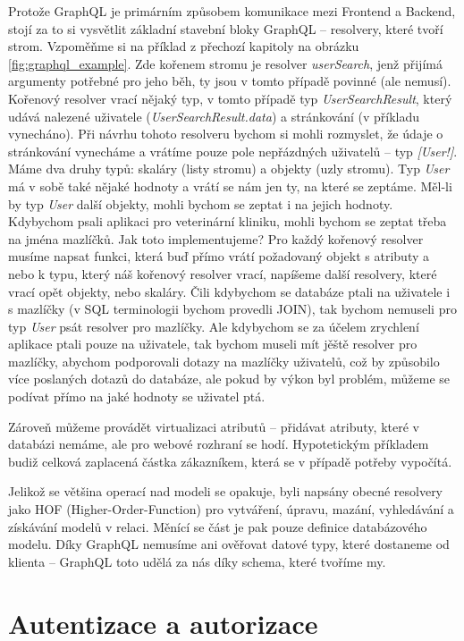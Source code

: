 Protože GraphQL je primárním způsobem komunikace mezi Frontend a Backend, stojí za to si vysvětlit základní stavební bloky
GraphQL -- resolvery, které tvoří strom. Vzpoměňme si na příklad z přechozí kapitoly na obrázku \ref{fig:graphql_example}.
Zde kořenem stromu je resolver \textit{userSearch}, jenž přijímá argumenty potřebné pro jeho běh, ty jsou v tomto případě
povinné (ale nemusí). Kořenový resolver vrací nějaký typ, v tomto případě typ \textit{UserSearchResult}, který udává nalezené
uživatele (\textit{UserSearchResult.data}) a stránkování (v příkladu vynecháno).
Při návrhu tohoto resolveru bychom si mohli rozmyslet, že údaje o stránkování vynecháme a vrátíme pouze
pole nepřázdných uživatelů -- typ \textit{[User!]}.
Máme dva druhy typů: skaláry (listy stromu) a objekty (uzly stromu).
Typ \textit{User} má v sobě také nějaké hodnoty a vrátí se nám jen ty, na které se zeptáme. Měl-li by typ \textit{User}
další objekty, mohli bychom se zeptat i na jejich hodnoty. Kdybychom psali aplikaci pro veterinární kliniku, mohli bychom se zeptat
třeba na jména mazlíčků.
Jak toto implementujeme? Pro každý kořenový resolver musíme napsat funkci, která buď přímo vrátí požadovaný objekt s atributy a nebo
k typu, který náš kořenový resolver vrací, napíšeme další resolvery, které vrací opět objekty, nebo skaláry.
Čili kdybychom se databáze ptali na uživatele i s
mazlíčky (v SQL terminologii bychom provedli JOIN), tak bychom nemuseli pro typ \textit{User} psát resolver pro mazlíčky.
Ale kdybychom se za účelem zrychlení aplikace ptali pouze na uživatele, tak bychom museli mít jěště resolver pro mazlíčky, abychom
podporovali dotazy na mazlíčky uživatelů, což by způsobilo více poslaných dotazů do databáze, ale pokud by výkon byl problém,
můžeme se podívat přímo na jaké hodnoty se uživatel ptá.
\citep[viz][]{GraphQLDoc}

Zároveň můžeme provádět virtualizaci atributů -- přidávat atributy, které v databázi nemáme, ale pro webové rozhraní se hodí.
Hypotetickým příkladem budiž celková zaplacená částka zákazníkem, která se v případě potřeby vypočítá.

Jelikož se většina operací nad modeli se opakuje, byli napsány obecné resolvery jako HOF (Higher-Order-Function)
pro vytváření, úpravu, mazání, vyhledávání a získávání modelů v relaci.
Měnící se část je pak pouze definice databázového modelu. Díky GraphQL nemusíme ani ověřovat datové typy, které dostaneme od klienta --
GraphQL toto udělá za nás díky schema, které tvoříme my.

\section{Autentizace a autorizace} \label{auther_authen}

